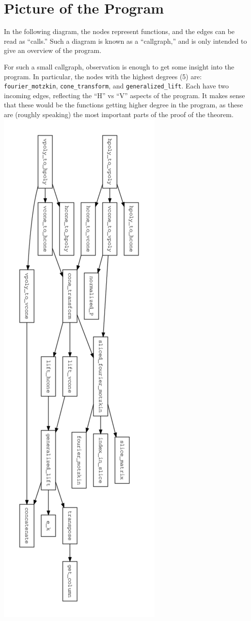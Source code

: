 \section{Picture of the Program}
In the following diagram, the nodes represent functions, and the edges can be read as ``calls.''  Such a diagram is known as a ``callgraph,'' and is only intended to give an overview of the program.

For such a small callgraph, observation is enough to get some insight into the program.  In particular, the nodes with the highest degrees (5) are: \\
\texttt{fourier\_motzkin}, \texttt{cone\_transform}, and \texttt{generalized\_lift}.  Each have two incoming edges, reflecting the ``H'' vs ``V'' aspects of the program.  It makes sense that these would be the functions getting higher degree in the program, as these are (roughly speaking) the most important parts of the proof of the theorem.
\includegraphics[keepaspectratio,width=\textwidth,height=\textheight]{../img/callgraph.pdf}

